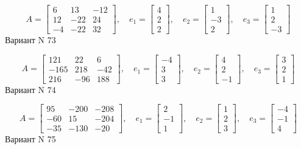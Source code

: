 \documentclass[11pt]{report}
\begin{document}
$$A = \left[\begin{matrix}6 & 13 & -12\\12 & -22 & 24\\-4 & -22 & 32\end{matrix}\right],\quad e_1 = \left[\begin{matrix}4\\2\\2\end{matrix}\right],\quad e_2 = \left[\begin{matrix}1\\-3\\2\end{matrix}\right],\quad e_3 = \left[\begin{matrix}1\\2\\-3\end{matrix}\right]$$Вариант N 73

$$A = \left[\begin{matrix}121 & 22 & 6\\-165 & 218 & -42\\216 & -96 & 188\end{matrix}\right],\quad e_1 = \left[\begin{matrix}-4\\3\\3\end{matrix}\right],\quad e_2 = \left[\begin{matrix}4\\2\\-1\end{matrix}\right],\quad e_3 = \left[\begin{matrix}3\\2\\1\end{matrix}\right]$$Вариант N 74

$$A = \left[\begin{matrix}95 & -200 & -208\\-60 & 15 & -204\\-35 & -130 & -20\end{matrix}\right],\quad e_1 = \left[\begin{matrix}2\\-1\\1\end{matrix}\right],\quad e_2 = \left[\begin{matrix}1\\2\\3\end{matrix}\right],\quad e_3 = \left[\begin{matrix}-4\\-1\\4\end{matrix}\right]$$Вариант N 75
\end{document}
